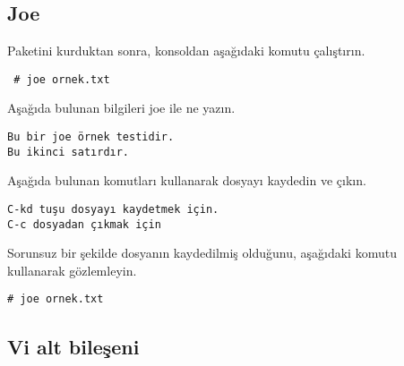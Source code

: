 \documentclass[a4paper,10pt]{article}
\begin{document}
\subsection*{Joe}

Paketini kurduktan sonra, konsoldan aşağıdaki komutu çalıştırın.

\begin{verbatim}
 # joe ornek.txt
\end{verbatim}

Aşağıda bulunan bilgileri joe ile ne yazın.
\begin{verbatim}
Bu bir joe örnek testidir.
Bu ikinci satırdır.
\end{verbatim}

Aşağıda bulunan komutları kullanarak dosyayı kaydedin ve çıkın.
\begin{verbatim}
C-kd tuşu dosyayı kaydetmek için.
C-c dosyadan çıkmak için
\end{verbatim}


Sorunsuz bir şekilde dosyanın kaydedilmiş olduğunu, aşağıdaki komutu kullanarak gözlemleyin.
\begin{verbatim}
# joe ornek.txt 
\end{verbatim}

\subsection*{Vi alt bileşeni}
\end{document}
